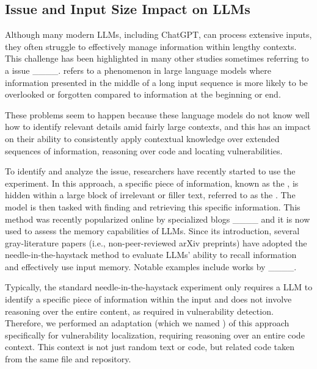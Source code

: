	\subsection{ Issue and Input Size Impact on LLMs} \label{sec:related_work:lost_in_the_middle} \label{sec:background:needle_in_the_haystack}
	
	Although many modern \acp{LLM}, including ChatGPT, can process extensive inputs, they often struggle to effectively manage information within lengthy contexts. 
	This challenge has been highlighted in many other studies sometimes referring to a  issue ____. 
	 refers to a phenomenon in large language models where information presented in the middle of a long input sequence is more likely to be overlooked or forgotten compared to information at the beginning or end.
	
	These problems seem to happen because these language models do not know well how to identify relevant details amid fairly large contexts, and this has an impact on their ability to consistently apply contextual knowledge over extended sequences of information, reasoning over code and locating vulnerabilities.
	
	To identify and analyze the  issue, researchers have recently started to use the  experiment.
	In this approach, a specific piece of information, known as the , is hidden within a large block of irrelevant or filler text, referred to as the . The model is then tasked with finding and retrieving this specific information.
	This method was recently popularized online by specialized blogs ____ and it is now used to assess the memory capabilities of \acp{LLM}.
	Since its introduction, several gray-literature papers (i.e., non-peer-reviewed arXiv preprints) have adopted the needle-in-the-haystack method to evaluate LLMs' ability to recall information and effectively use input memory. Notable examples include works by ____.
	
	Typically, the standard needle-in-the-haystack experiment only requires a \ac{LLM} to identify a specific piece of information within the input and does not involve reasoning over the entire content, as required in vulnerability detection.
	Therefore, we performed an adaptation (which we named ) of this approach specifically for vulnerability localization, requiring reasoning over an entire code context. This context is not just random text or code, but related code taken from the same file and repository.
	
